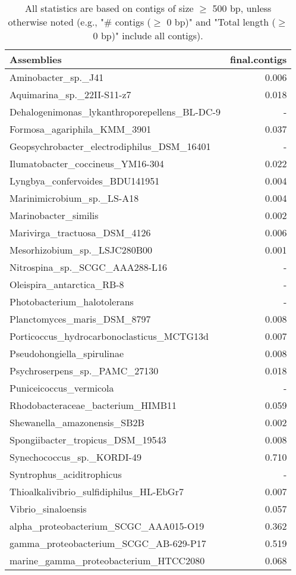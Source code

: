 \documentclass[12pt,a4paper]{article}
\begin{document}
\begin{table}[ht]
\begin{center}
\caption{All statistics are based on contigs of size $\geq$ 500 bp, unless otherwise noted (e.g., "\# contigs ($\geq$ 0 bp)" and "Total length ($\geq$ 0 bp)" include all contigs).}
\begin{tabular}{|l*{1}{|r}|}
\hline
Assemblies & final.contigs \\ \hline
Aminobacter\_sp.\_J41 & 0.006 \\ \hline
Aquimarina\_sp.\_22II-S11-z7 & 0.018 \\ \hline
Dehalogenimonas\_lykanthroporepellens\_BL-DC-9 & - \\ \hline
Formosa\_agariphila\_KMM\_3901 & 0.037 \\ \hline
Geopsychrobacter\_electrodiphilus\_DSM\_16401 & - \\ \hline
Ilumatobacter\_coccineus\_YM16-304 & 0.022 \\ \hline
Lyngbya\_confervoides\_BDU141951 & 0.004 \\ \hline
Marinimicrobium\_sp.\_LS-A18 & 0.004 \\ \hline
Marinobacter\_similis & 0.002 \\ \hline
Marivirga\_tractuosa\_DSM\_4126 & 0.006 \\ \hline
Mesorhizobium\_sp.\_LSJC280B00 & 0.001 \\ \hline
Nitrospina\_sp.\_SCGC\_AAA288-L16 & - \\ \hline
Oleispira\_antarctica\_RB-8 & - \\ \hline
Photobacterium\_halotolerans & - \\ \hline
Planctomyces\_maris\_DSM\_8797 & 0.008 \\ \hline
Porticoccus\_hydrocarbonoclasticus\_MCTG13d & 0.007 \\ \hline
Pseudohongiella\_spirulinae & 0.008 \\ \hline
Psychroserpens\_sp.\_PAMC\_27130 & 0.018 \\ \hline
Puniceicoccus\_vermicola & - \\ \hline
Rhodobacteraceae\_bacterium\_HIMB11 & 0.059 \\ \hline
Shewanella\_amazonensis\_SB2B & 0.002 \\ \hline
Spongiibacter\_tropicus\_DSM\_19543 & 0.008 \\ \hline
Synechococcus\_sp.\_KORDI-49 & 0.710 \\ \hline
Syntrophus\_aciditrophicus & - \\ \hline
Thioalkalivibrio\_sulfidiphilus\_HL-EbGr7 & 0.007 \\ \hline
Vibrio\_sinaloensis & 0.057 \\ \hline
alpha\_proteobacterium\_SCGC\_AAA015-O19 & 0.362 \\ \hline
gamma\_proteobacterium\_SCGC\_AB-629-P17 & 0.519 \\ \hline
marine\_gamma\_proteobacterium\_HTCC2080 & 0.068 \\ \hline
\end{tabular}
\end{center}
\end{table}
\end{document}
